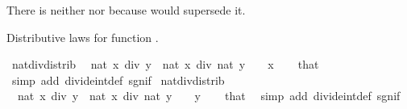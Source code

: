 \begin{isabellebody}
\begin{isamarkuptext}
There is neither  nor 
  because  would supersede it.%
\end{isamarkuptext}\isamarkuptrue%
%
\begin{isamarkuptext}%
Distributive laws for function .%
\end{isamarkuptext}\isamarkuptrue%
\isamarkupfalse%
\ nat{\isacharunderscore}{\kern0pt}div{\isacharunderscore}{\kern0pt}distrib{\isacharcolon}{\kern0pt}\isanewline
\ \ {\isacartoucheopen}nat\ {\isacharparenleft}{\kern0pt}x\ div\ y{\isacharparenright}{\kern0pt}\ {\isacharequal}{\kern0pt}\ nat\ x\ div\ nat\ y{\isacartoucheclose}\ \ {\isacartoucheopen}{}\ {\isasymle}\ x{\isacartoucheclose}\isanewline
%
\isadelimproof
\ \ %
\endisadelimproof
%
\isatagproof
{}\isamarkupfalse%
\ that\ \isamarkupfalse%
\ {\isacharparenleft}{\kern0pt}simp\ add{\isacharcolon}{\kern0pt}\ divide{\isacharunderscore}{\kern0pt}int{\isacharunderscore}{\kern0pt}def\ sgn{\isacharunderscore}{\kern0pt}if{\isacharparenright}{\kern0pt}%
\endisatagproof
{\isafoldproof}%
%
\isadelimproof
\isanewline
%
\endisadelimproof
\isanewline
{}\isamarkupfalse%
\ nat{\isacharunderscore}{\kern0pt}div{\isacharunderscore}{\kern0pt}distrib{\isacharprime}{\kern0pt}{\isacharcolon}{\kern0pt}\isanewline
\ \ {\isacartoucheopen}nat\ {\isacharparenleft}{\kern0pt}x\ div\ y{\isacharparenright}{\kern0pt}\ {\isacharequal}{\kern0pt}\ nat\ x\ div\ nat\ y{\isacartoucheclose}\ \ {\isacartoucheopen}{}\ {\isasymle}\ y{\isacartoucheclose}\isanewline
%
\isadelimproof
\ \ %
\endisadelimproof
%
\isatagproof
{}\isamarkupfalse%
\ that\ \isamarkupfalse%
\ {\isacharparenleft}{\kern0pt}simp\ add{\isacharcolon}{\kern0pt}\ divide{\isacharunderscore}{\kern0pt}int{\isacharunderscore}{\kern0pt}def\ sgn{\isacharunderscore}{\kern0pt}if{\isacharparenright}{\kern0pt}%
\endisatagproof
{\isafoldproof}%
%
\isadelimproof
\isanewline
%
\endisadelimproof
\isanewline
{}\isamarkupfalse%

\end{isabellebody}
